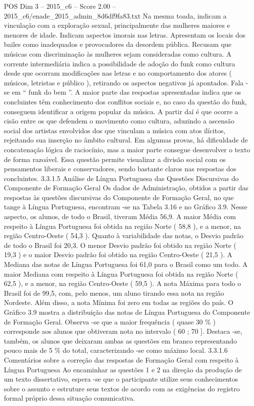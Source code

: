 \begin{textsample}{POS Dim 3 – 2015\_c6 – Score 2.00 – 2015\_c6/enade\_2015\_admin\_8d6df9fa83.txt}
Na mesma toada, indicam a vinculação com a exploração sexual, principalmente das mulheres maiores e menores de idade.
Indicam aspectos imorais nas letras.
Apresentam os locais dos bailes como inadequados e provocadores da desordem pública.
Recusam que músicas com discriminação às mulheres sejam consideradas como cultura.
A corrente intermediária indica a possibilidade de adoção do funk como cultura desde que ocorram modificações nas letras e no comportamento dos atores ( músicos, letristas e público ), retirando os aspectos negativos já apontados.
Fala -se em “ funk do bem ”.
A maior parte das respostas apresentadas indica que os concluintes têm conhecimento dos conflitos sociais e, no caso da questão do funk, conseguem identificar a origem popular da música.
A partir daí é que ocorre a cisão entre os que defendem o movimento como cultura, aduzindo a ascensão social dos artistas envolvidos dos que vinculam a música com atos ilícitos, rejeitando sua inserção no âmbito cultural.
Em algumas provas, há dificuldade de concatenação lógica de raciocínio, mas a maior parte consegue desenvolver o texto de forma razoável.
Essa questão permite visualizar a divisão social com os pensamentos liberais e conservadores, sendo bastante claros nas respostas dos concluintes. 3.3.1.5 Análise de Língua Portuguesa das Questões Discursivas do Componente de Formação Geral Os dados de Administração, obtidos a partir das respostas às questões discursivas do Componente de Formação Geral, no que tange à Língua Portuguesa, encontram -se na Tabela 3.16 e no Gráfico 3.9.
Nesse aspecto, os alunos, de todo o Brasil, tiveram Média 56,9.
A maior Média com respeito à Língua Portuguesa foi obtida na região Norte ( 58,8 ), e a menor, na região Centro-Oeste ( 54,3 ).
Quanto à variabilidade das notas, o Desvio padrão de todo o Brasil foi 20,3.
O menor Desvio padrão foi obtido na região Norte ( 19,3 ) e o maior Desvio padrão foi obtido na região Centro-Oeste ( 21,5 ).
A Mediana das notas de Língua Portuguesa foi 61,0 para o Brasil como um todo.
A maior Mediana com respeito à Língua Portuguesa foi obtida na região Norte ( 62,5 ), e a menor, na região Centro-Oeste ( 59,5 ).
A nota Máxima para todo o Brasil foi de 99,5, com, pelo menos, um aluno tirando essa nota na região Nordeste.
Além disso, a nota Mínima foi zero em todas as regiões do país.
O Gráfico 3.9 mostra a distribuição das notas de Língua Portuguesa do Componente de Formação Geral.
Observa -se que a maior frequência ( quase 30 \% ) corresponde aos alunos que obtiveram nota no intervalo ( 60 ; 70 ].
Destaca -se, também, os alunos que deixaram ambas as questões em branco representando pouco mais de 5 \% do total, caracterizando -se como máximo local. 3.3.1.6 Comentários sobre a correção das respostas de Formação Geral com respeito à Língua Portuguesa Ao encaminhar as questões 1 e 2 na direção da produção de um texto dissertativo, espera -se que o participante utilize seus conhecimentos sobre o assunto e estruture seus textos de acordo com as exigências do registro formal próprio dessa situação comunicativa.

\end{textsample}
